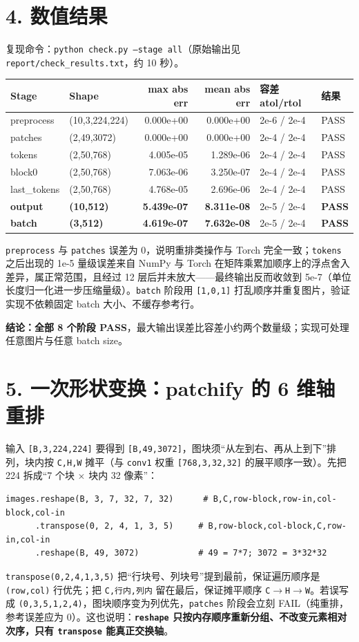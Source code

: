 \documentclass[11pt,a4paper]{article}
\newcommand{\hl}[1]{\textcolor{red!85!black}{\textbf{#1}}}
\newcommand{\code}[1]{\texttt{\small #1}}
\begin{document}
\section*{4. 数值结果}
复现命令：\code{python check.py --stage all}（原始输出见 \code{report/check\_results.txt}，约 10 秒）。
\begin{table}[h!]
\centering\small
\begin{tabular}{@{}l l r r l l@{}}
\toprule
Stage & Shape & max abs err & mean abs err & 容差 atol/rtol & 结果\\
\midrule
preprocess    & (10,3,224,224) & 0.000e+00 & 0.000e+00 & 2e-6 / 2e-4 & PASS\\
patches       & (2,49,3072)    & 0.000e+00 & 0.000e+00 & 2e-4 / 2e-4 & PASS\\
tokens        & (2,50,768)     & 4.005e-05 & 1.289e-06 & 2e-4 / 2e-4 & PASS\\
block0        & (2,50,768)     & 7.063e-06 & 3.250e-07 & 2e-4 / 2e-4 & PASS\\
last\_tokens  & (2,50,768)     & 4.768e-05 & 2.696e-06 & 2e-4 / 2e-4 & PASS\\
\textbf{output} & \textbf{(10,512)} & \hl{5.439e-07} & \hl{8.311e-08} & 2e-5 / 2e-4 & \textbf{PASS}\\
\textbf{batch}  & \textbf{(3,512)}  & \hl{4.619e-07} & \hl{7.632e-08} & 2e-5 / 2e-4 & \textbf{PASS}\\
\bottomrule
\end{tabular}
\end{table}
\code{preprocess} 与 \code{patches} 误差为 0，说明重排类操作与 Torch 完全一致；\code{tokens} 之后出现的 1e-5 量级误差来自 NumPy 与 Torch 在矩阵乘累加顺序上的浮点舍入差异，属正常范围，且经过 12 层后并未放大——最终输出反而收敛到 5e-7（单位长度归一化进一步压缩量级）。\code{batch} 阶段用 \code{[1,0,1]} 打乱顺序并重复图片，验证实现不依赖固定 batch 大小、不缓存参考行。

\noindent\colorbox{red!6}{\parbox{\dimexpr\linewidth-2\fboxsep\relax}{\hl{结论：全部 8 个阶段 PASS}，最大输出误差比容差小约两个数量级；实现可处理任意图片与任意 batch size。}}

\section*{5. 一次形状变换：patchify 的 6 维轴重排}
输入 \code{[B,3,224,224]} 要得到 \code{[B,49,3072]}，图块须``从左到右、再从上到下''排列，块内按 \code{C,H,W} 摊平（与 \code{conv1} 权重 \code{[768,3,32,32]} 的展平顺序一致）。先把 224 拆成``7 个块 $\times$ 块内 32 像素''：
\begin{verbatim}
images.reshape(B, 3, 7, 32, 7, 32)      # B,C,row-block,row-in,col-block,col-in
      .transpose(0, 2, 4, 1, 3, 5)     # B,row-block,col-block,C,row-in,col-in
      .reshape(B, 49, 3072)            # 49 = 7*7; 3072 = 3*32*32
\end{verbatim}
\code{transpose(0,2,4,1,3,5)} 把``行块号、列块号''提到最前，保证遍历顺序是 \code{(row,col)} 行优先；把 \code{C,行内,列内} 留在最后，保证摊平顺序 \code{C$\to$H$\to$W}。若误写成 \code{(0,3,5,1,2,4)}，图块顺序变为列优先，\code{patches} 阶段会立刻 FAIL（纯重排，参考误差应为 0）。这也说明：\hl{\code{reshape} 只按内存顺序重新分组、不改变元素相对次序，只有 \code{transpose} 能真正交换轴}。
\end{document}
